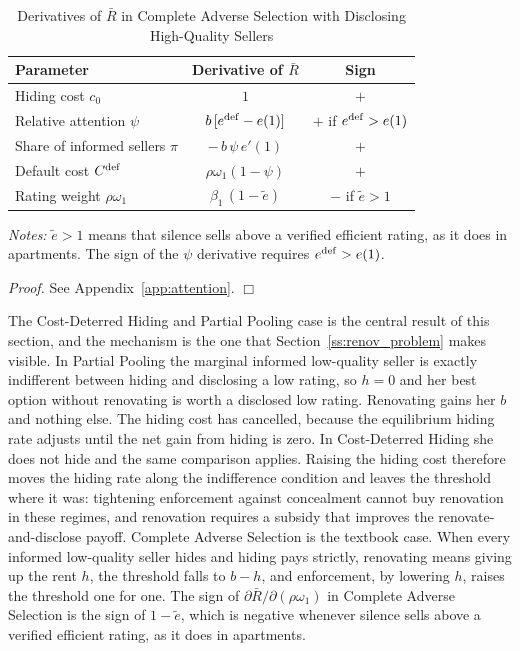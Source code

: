 \documentclass[10pt,letterpaper]{bp-template-concise}
\begin{document}
\begin{table}[htbp]
\centering
\caption{Derivatives of $\bar R$ in Complete Adverse Selection with Disclosing High-Quality Sellers}
\label{tab:threshold_cs}
\small\renewcommand{\arraystretch}{1.4}
\begin{tabular*}{\textwidth}{@{\extracolsep{\fill}}lcc@{}}
\toprule\toprule
\textbf{Parameter} & \textbf{Derivative of $\bar R$} & \textbf{Sign} \\
\midrule
Hiding cost $c_0$ & $1$ & $+$ \\
Relative attention $\psi$ & $b\,[e^{\rm def}-e(1)]$ & $+$ if $e^{\rm def}>e(1)$ \\
Share of informed sellers $\pi$ & $-\,b\,\psi\,e'(1)$ & $+$ \\
Default cost $C^{\rm def}$ & $\rho\omega_1(1-\psi)$ & $+$ \\
Rating weight $\rho\omega_1$ & $\beta_1\,(1-\tilde e)$ & $-$ if $\tilde e>1$ \\
\bottomrule\bottomrule
\end{tabular*}
\vspace{0.5em}

\raggedright
\footnotesize
\textit{Notes:} $\tilde e>1$ means that silence sells above a verified efficient rating, as it does in apartments. The sign of the $\psi$ derivative requires $e^{\rm def}>e(1)$.
\end{table}

\noindent\textit{Proof.} See Appendix~\ref{app:attention}. $\Box$

\medskip

The Cost-Deterred Hiding and Partial Pooling case is the central result of this section, and the mechanism is the one that Section~\ref{ss:renov_problem} makes visible. In Partial Pooling the marginal informed low-quality seller is exactly indifferent between hiding and disclosing a low rating, so $h=0$ and her best option without renovating is worth a disclosed low rating. Renovating gains her $b$ and nothing else. The hiding cost has cancelled, because the equilibrium hiding rate adjusts until the net gain from hiding is zero. In Cost-Deterred Hiding she does not hide and the same comparison applies. Raising the hiding cost therefore moves the hiding rate along the indifference condition and leaves the threshold where it was: tightening enforcement against concealment cannot buy renovation in these regimes, and renovation requires a subsidy that improves the renovate-and-disclose payoff. Complete Adverse Selection is the textbook case. When every informed low-quality seller hides and hiding pays strictly, renovating means giving up the rent $h$, the threshold falls to $b-h$, and enforcement, by lowering $h$, raises the threshold one for one. The sign of $\partial\bar R/\partial(\rho\omega_1)$ in Complete Adverse Selection is the sign of $1-\tilde e$, which is negative whenever silence sells above a verified efficient rating, as it does in apartments.
\end{document}
